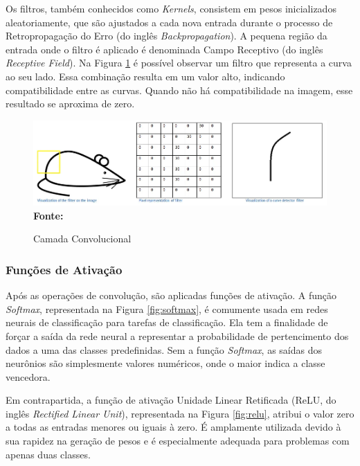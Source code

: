 Os filtros, também conhecidos como \textit{Kernels}, consistem em pesos inicializados aleatoriamente, que são ajustados a cada nova entrada durante o processo de Retropropagação do Erro (do inglês \textit{Backpropagation}). A pequena região da entrada onde o filtro é aplicado é denominada Campo Receptivo (do inglês \textit{Receptive Field}). Na Figura \ref{fig:conv2} é possível observar um filtro que representa a curva ao seu lado. Essa combinação resulta em um valor alto, indicando compatibilidade entre as curvas. Quando não há compatibilidade na imagem, esse resultado se aproxima de zero.

\begin{figure}[ht]
 	\centering	
 	\caption[\hspace{0.1cm}Grade Computacional.]{Camada Convolucional}
 	\vspace{-0.4cm}
 	\includegraphics[width=1\textwidth]{figuras/conv.png}
 	\captionsetup{justification=centering}
	\vspace{-0.2cm}
     \\\textbf{\footnotesize Fonte: \cite{cnns}}
	\label{fig:conv2}
\end{figure}


\subsubsection{\esp Funções de Ativação} \label{funcAtiv}

Após as operações de convolução, são aplicadas funções de ativação. A função \textit{Softmax}, representada na Figura \ref{fig:softmax}, é comumente usada em redes neurais de classificação para tarefas de classificação. Ela tem a finalidade de forçar a saída da rede neural a representar a probabilidade de pertencimento dos dados a uma das classes predefinidas. Sem a função \textit{Softmax}, as saídas dos neurônios são simplesmente valores numéricos, onde o maior indica a classe vencedora. 

Em contrapartida, a função de ativação Unidade Linear Retificada (ReLU, do inglês \textit{Rectified Linear Unit}), representada na Figura \ref{fig:relu}, atribui o valor zero a todas as entradas menores ou iguais à zero. É amplamente utilizada devido à sua rapidez na geração de pesos e é especialmente adequada para problemas com apenas duas classes.

